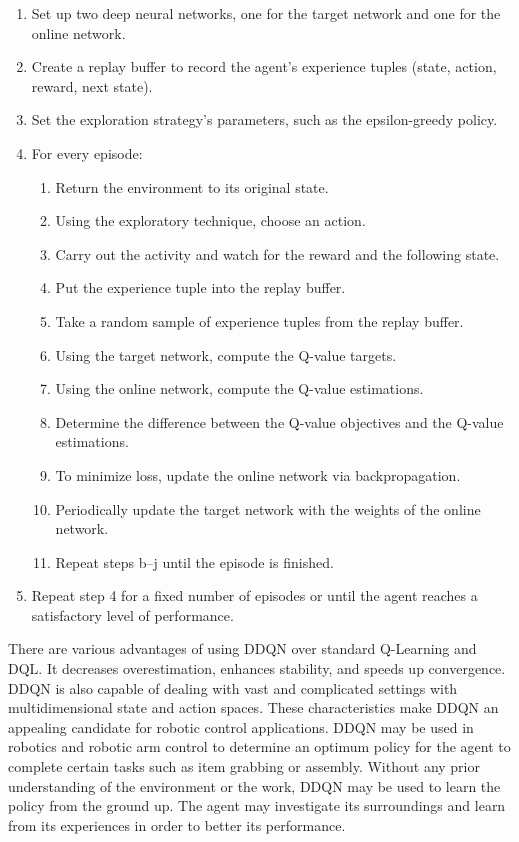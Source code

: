 \documentclass[12pt,oneside]{article}
\begin{document}
\begin{enumerate}
\item Set up two deep neural networks, one for the target network and one for the online network.
\item Create a replay buffer to record the agent's experience tuples (state, action, reward, next state).
\item Set the exploration strategy's parameters, such as the epsilon-greedy policy.
\item For every episode:
\begin{enumerate}
\item Return the environment to its original state.
\item Using the exploratory technique, choose an action.
\item Carry out the activity and watch for the reward and the following state.
\item Put the experience tuple into the replay buffer.
\item Take a random sample of experience tuples from the replay buffer.
\item Using the target network, compute the Q-value targets.
\item Using the online network, compute the Q-value estimations.
\item Determine the difference between the Q-value objectives and the Q-value estimations.
\item To minimize loss, update the online network via backpropagation.
\item Periodically update the target network with the weights of the online network.
\item Repeat steps b–j until the episode is finished.
\end{enumerate}
\item Repeat step 4 for a fixed number of episodes or until the agent reaches a satisfactory level of performance.
\end{enumerate}

There are various advantages of using DDQN over standard Q-Learning and DQL. It decreases overestimation, enhances stability, and speeds up convergence. DDQN is also capable of dealing with vast and complicated settings with multidimensional state and action spaces. These characteristics make DDQN an appealing candidate for robotic control applications.
DDQN may be used in robotics and robotic arm control to determine an optimum policy for the agent to complete certain tasks such as item grabbing or assembly. Without any prior understanding of the environment or the work, DDQN may be used to learn the policy from the ground up. The agent may investigate its surroundings and learn from its experiences in order to better its performance.
\end{document}
